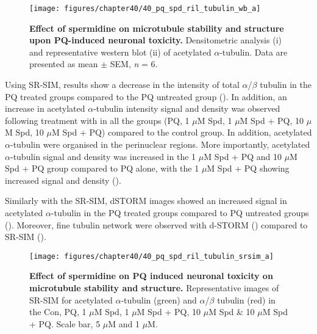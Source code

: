 \begin{figure}[!htbp]
\center
  \texttt{[image: figures/chapter40/40\_pq\_spd\_ril\_tubulin\_wb\_a]}
  \caption[Effect of spermidine on microtubule stability and structure upon PQ-induced neuronal toxicity]{\textbf{Effect of spermidine on microtubule stability and structure upon PQ-induced neuronal toxicity.} Densitometric analysis (i) and representative western blot  (ii) of acetylated $\alpha$-tubulin. Data are presented as mean $\pm$ SEM, \textit{n} = 6.}
  \label{fig:40_pq_spd_ril_tubulin_wb_a}
\end{figure} 

Using SR-SIM, results show a decrease in the intensity of total $\alpha$/$\beta$ tubulin in the PQ treated groups compared to the PQ untreated group (). In addition, an increase in acetylated $\alpha$-tubulin intensity signal and density was observed following treatment with in all the groups (PQ, 1 $\mu$M Spd, 1 $\mu$M Spd + PQ, 10 $\mu$M Spd, 10 $\mu$M Spd + PQ) compared to the control group. In addition, acetylated $\alpha$-tubulin were organised in the perinuclear regions. More importantly, acetylated $\alpha$-tubulin signal and density was increased in the 1 $\mu$M Spd + PQ and 10 $\mu$M Spd + PQ group compared to PQ alone, with the 1 $\mu$M Spd + PQ showing increased signal and density (). 

Similarly with the SR-SIM, dSTORM images showed an increased signal in acetylated $\alpha$-tubulin in the PQ treated groups compared to PQ untreated groups (). Moreover, fine tubulin network were observed with d-STORM () compared to SR-SIM ().


\begin{landscape}
\begin{figure}[!htbp]
\center
  \texttt{[image: figures/chapter40/40\_pq\_spd\_ril\_tubulin\_srsim\_a]}
  \caption[Effect of spermidine on PQ induced neuronal toxicity on microtubule stability and structure]{\textbf{Effect of spermidine on PQ induced neuronal toxicity on microtubule stability and structure.} Representative images of SR-SIM for acetylated $\alpha$-tubulin (green) and $\alpha$/$\beta$ tubulin (red) in the Con, PQ, 1 $\mu$M Spd, 1 $\mu$M Spd + PQ, 10 $\mu$M Spd \& 10 $\mu$M Spd + PQ. Scale bar, 5 $\mu$M and 1 $\mu$M.}
  \label{fig:40_pq_spd_ril_tubulin_srsim_a}
\end{figure} 
\end{landscape}

